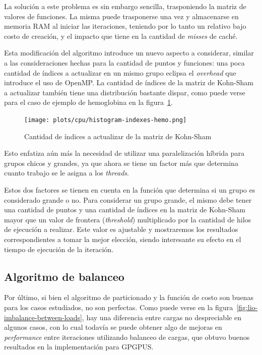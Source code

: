 La soluci\'on a este problema es sin embargo sencilla, trasponiendo la matriz de
valores de funciones. La misma puede trasponerse una vez y almacenarse en memoria
RAM al iniciar las iteraciones, teniendo por lo tanto un relativo bajo costo de
creaci\'on, y el impacto que tiene en la cantidad de \textit{misses} de cach\'e.

Esta modificaci\'on del algoritmo introduce un nuevo aspecto a considerar, similar
a las consideraciones hechas para la cantidad de puntos y funciones: una poca
cantidad de \'indices a actualizar en un mismo grupo eclipsa el \textit{overhead}
que introduce el uso de OpenMP. La cantidad de \'indices de la matriz de Kohn-Sham a
actualizar tambi\'en tiene una distribuci\'on bastante dispar, como puede verse
para el caso de ejemplo de hemoglobina en la figura~\ref{fig:histogram-indexes-hemo}.

\begin{figure}[htbp]
   \centering
   \texttt{[image: plots/cpu/histogram-indexes-hemo.png]}
   \caption{Cantidad de \'indices a actualizar de la matriz de Kohn-Sham}
   \label{fig:histogram-indexes-hemo}
\end{figure}

Esto enfatiza a\'un m\'as la necesidad de utilizar una paralelizaci\'on h\'ibrida
para grupos chicos y grandes, ya que ahora se tiene un factor m\'as que determina
cuanto trabajo se le asigna a los \textit{threads}.

Estos dos factores se tienen en cuenta en la funci\'on que determina si un grupo
es considerado grande o no. Para considerar un grupo grande, el mismo debe tener
una cantidad de puntos y una cantidad de \'indices en la matriz de Kohn-Sham mayor que
un valor de frontera (\textit{threshold}) multiplicado por la cantidad de hilos de
ejecuci\'on a realizar. Este valor es ajustable y mostraremos los resultados
correspondientes a tomar la mejor elecci\'on, siendo interesante su efecto en el
tiempo de ejecuci\'on de la iteraci\'on.

\subsection{Algoritmo de balanceo}

Por \'ultimo, si bien el algoritmo de particionado y la funci\'on de costo son
buenas para los casos estudiados, no son perfectas. Como puede verse en la
figura~\ref{fig:lio-imbalance-between-loads}, hay una diferencia entre cargas
no despreciable en algunos casos, con lo cual todav\'ia se puede obtener algo de
mejoras en \textit{performance} entre iteraciones utilizando balanceo de cargas,
que obtuvo buenos resultados en la implementaci\'on para GPGPUS.

